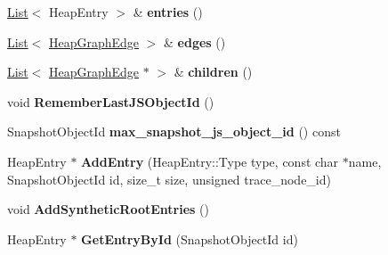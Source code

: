\begin{DoxyCompactItemize}
\item 
\hyperlink{classv8_1_1internal_1_1_list}{List}$<$ Heap\+Entry $>$ \& {\bfseries entries} ()\hypertarget{classv8_1_1internal_1_1_heap_snapshot_a3f1be573b72409ec46e2bb879722c8d9}{}\label{classv8_1_1internal_1_1_heap_snapshot_a3f1be573b72409ec46e2bb879722c8d9}

\item 
\hyperlink{classv8_1_1internal_1_1_list}{List}$<$ \hyperlink{classv8_1_1_heap_graph_edge}{Heap\+Graph\+Edge} $>$ \& {\bfseries edges} ()\hypertarget{classv8_1_1internal_1_1_heap_snapshot_a95cb3d37dcc3cee74f57b6d7014047d5}{}\label{classv8_1_1internal_1_1_heap_snapshot_a95cb3d37dcc3cee74f57b6d7014047d5}

\item 
\hyperlink{classv8_1_1internal_1_1_list}{List}$<$ \hyperlink{classv8_1_1_heap_graph_edge}{Heap\+Graph\+Edge} $\ast$ $>$ \& {\bfseries children} ()\hypertarget{classv8_1_1internal_1_1_heap_snapshot_a4a458a15c70397764060821cf9b27a39}{}\label{classv8_1_1internal_1_1_heap_snapshot_a4a458a15c70397764060821cf9b27a39}

\item 
void {\bfseries Remember\+Last\+J\+S\+Object\+Id} ()\hypertarget{classv8_1_1internal_1_1_heap_snapshot_a728b4c7878a21901a906fca5f0880d98}{}\label{classv8_1_1internal_1_1_heap_snapshot_a728b4c7878a21901a906fca5f0880d98}

\item 
Snapshot\+Object\+Id {\bfseries max\+\_\+snapshot\+\_\+js\+\_\+object\+\_\+id} () const \hypertarget{classv8_1_1internal_1_1_heap_snapshot_a0f0380a6a599542acc0fa62b6223a059}{}\label{classv8_1_1internal_1_1_heap_snapshot_a0f0380a6a599542acc0fa62b6223a059}

\item 
Heap\+Entry $\ast$ {\bfseries Add\+Entry} (Heap\+Entry\+::\+Type type, const char $\ast$name, Snapshot\+Object\+Id id, size\+\_\+t size, unsigned trace\+\_\+node\+\_\+id)\hypertarget{classv8_1_1internal_1_1_heap_snapshot_a9028b9fa71881d3260ef1b037d58d4f6}{}\label{classv8_1_1internal_1_1_heap_snapshot_a9028b9fa71881d3260ef1b037d58d4f6}

\item 
void {\bfseries Add\+Synthetic\+Root\+Entries} ()\hypertarget{classv8_1_1internal_1_1_heap_snapshot_a0f939339bb8e7574baf78d2b059d50d1}{}\label{classv8_1_1internal_1_1_heap_snapshot_a0f939339bb8e7574baf78d2b059d50d1}

\item 
Heap\+Entry $\ast$ {\bfseries Get\+Entry\+By\+Id} (Snapshot\+Object\+Id id)\hypertarget{classv8_1_1internal_1_1_heap_snapshot_aa8f063ba3910f5bfb9b324fc52a92cca}{}\label{classv8_1_1internal_1_1_heap_snapshot_aa8f063ba3910f5bfb9b324fc52a92cca}


\end{DoxyCompactItemize}
